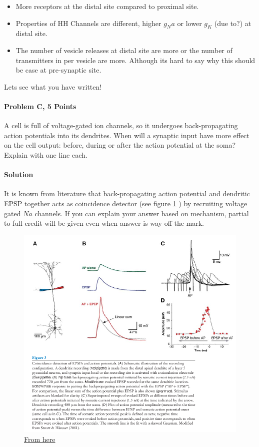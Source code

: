 \documentclass[a4paper,10pt]{article}
\begin{document}
\begin{itemize}
    \item More receptors at the distal site compared to proximal site.
    \item Properties of HH Channels are different, higher $g_Na$ or lower $g_K$ (due
        to?) at distal site.
    \item The number of vesicle releases at distal site are more or the number
        of transmitters in per vesicle are more. Although its hard to say why
        this should be case at pre-synaptic site.
\end{itemize}

Lets see what you have written!


\paragraph{Problem C, 5 Points} A cell is full of voltage-gated ion channels, so
it undergoes back-propagating action potentials into its dendrites. When will a
synaptic input have more effect on the cell output: before, during or after the
action potential at the soma? Explain with one line each.

\paragraph{Solution}  It is known from literature that back-propagating action
potential and dendritic EPSP together acts as coincidence detector (see figure
\ref{fig:5} ) by recruiting voltage gated $Na$ channels. If you can explain your
answer based on mechanism, partial to full credit will be given even when answer
is way off the mark.

\begin{figure}[ht!]
\begin{center}
    \includegraphics[width=1\textwidth]{./backPropagatingAPplusEPSP.png}
\end{center}
\caption{ 
\href{http://www.cogsci.ucsd.edu/~sereno/201/readings/02.08-DendriteComp.pdf}{From here}
}
\label{fig:5}
\end{figure}
\end{document}
